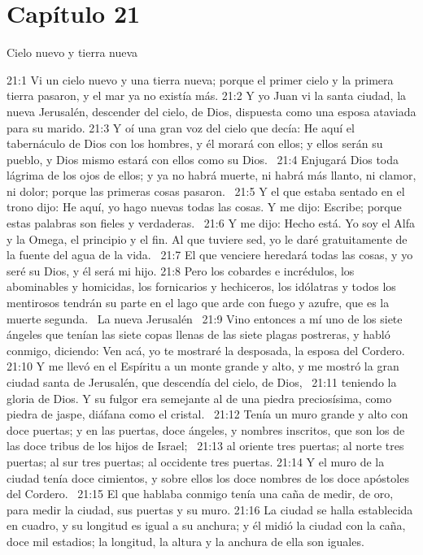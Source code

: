 \section*{Capítulo 21}
Cielo nuevo y tierra nueva  

21:1 Vi un cielo nuevo y una tierra nueva; porque el primer cielo y la primera tierra pasaron, y el mar ya no existía más. 
21:2 Y yo Juan vi la santa ciudad, la nueva Jerusalén, descender del cielo, de Dios, dispuesta como una esposa ataviada para su marido. 
21:3 Y oí una gran voz del cielo que decía: He aquí el tabernáculo de Dios con los hombres, y él morará con ellos; y ellos serán su pueblo, y Dios mismo estará con ellos como su Dios.  
21:4 Enjugará Dios toda lágrima de los ojos de ellos; y ya no habrá muerte, ni habrá más llanto, ni clamor, ni dolor; porque las primeras cosas pasaron.  
21:5 Y el que estaba sentado en el trono dijo: He aquí, yo hago nuevas todas las cosas. Y me dijo: Escribe; porque estas palabras son fieles y verdaderas.  
21:6 Y me dijo: Hecho está. Yo soy el Alfa y la Omega, el principio y el fin. Al que tuviere sed, yo le daré gratuitamente de la fuente del agua de la vida.  
21:7 El que venciere heredará todas las cosas, y yo seré su Dios, y él será mi hijo. 
21:8 Pero los cobardes e incrédulos, los abominables y homicidas, los fornicarios y hechiceros, los idólatras y todos los mentirosos tendrán su parte en el lago que arde con fuego y azufre, que es la muerte segunda.  
La nueva Jerusalén  
21:9 Vino entonces a mí uno de los siete ángeles que tenían las siete copas llenas de las siete plagas postreras, y habló conmigo, diciendo: Ven acá, yo te mostraré la desposada, la esposa del Cordero.  
21:10 Y me llevó en el Espíritu a un monte grande y alto, y me mostró la gran ciudad santa de Jerusalén, que descendía del cielo, de Dios,  
21:11 teniendo la gloria de Dios. Y su fulgor era semejante al de una piedra preciosísima, como piedra de jaspe, diáfana como el cristal.  
21:12 Tenía un muro grande y alto con doce puertas; y en las puertas, doce ángeles, y nombres inscritos, que son los de las doce tribus de los hijos de Israel;  
21:13 al oriente tres puertas; al norte tres puertas; al sur tres puertas; al occidente tres puertas. 
21:14 Y el muro de la ciudad tenía doce cimientos, y sobre ellos los doce nombres de los doce apóstoles del Cordero.  
21:15 El que hablaba conmigo tenía una caña de medir, de oro, para medir la ciudad, sus puertas y su muro. 
21:16 La ciudad se halla establecida en cuadro, y su longitud es igual a su anchura; y él midió la ciudad con la caña, doce mil estadios; la longitud, la altura y la anchura de ella son iguales.  
